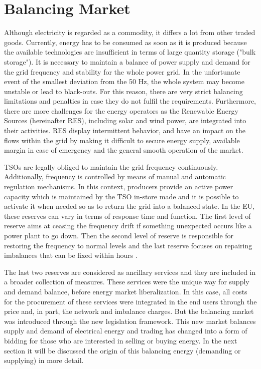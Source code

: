 \section{Balancing Market}
\par Although electricity is regarded as a commodity, it differs a lot from other traded goods. Currently, energy has to be consumed as soon as it is produced because the available technologies are insufficient in terms of large quantity storage ("bulk storage"). It is necessary to maintain a balance of power supply and demand for the grid frequency and stability for the whole power grid. In the unfortunate event of the smallest deviation from the 50 Hz, the whole system may become unstable or lead to black-outs. For this reason, there are very strict balancing limitations and penalties in case they do not fulfil the requirements. Furthermore, there are more challenges for the energy operators as the Renewable Energy Sources (hereinafter RES), including solar and wind power, are integrated into their activities. RES display intermittent behavior, and have an impact on the flows within the grid by making it difficult to secure energy supply, available margin in case of emergency and the general smooth operation of the market.
\par TSOs are legally obliged to maintain the grid frequency continuously. Additionally, frequency is controlled by means of manual and automatic regulation mechanisms. In this context, producers provide an active power capacity which is maintained by the TSO in-store made and it is possible to activate it when needed so as to return the grid into a balanced state. In the EU, these reserves can vary in terms of response time and function. The first level of reserve aims at ceasing the frequency drift if something unexpected occurs like a power plant to go down. Then the second level of reserve is responsible for restoring the frequency to normal levels and the last reserve focuses on repairing imbalances that can be fixed within hours \cite{kern2009implementing}. 
\par The last two reserves are considered as ancillary services and they are included in a broader collection of measures. These services were the unique way for supply and demand balance, before energy market liberalization. In this case, all costs for the procurement of these services were integrated in the end users through the price and, in part, the network and imbalance charges. But the balancing market was introduced through the new legislation framework. This new market balances supply and demand of electrical energy and trading has changed into a form of bidding for those who are interested in selling or buying energy. In the next section it will be discussed the origin of this balancing energy (demanding or supplying) in more detail.
